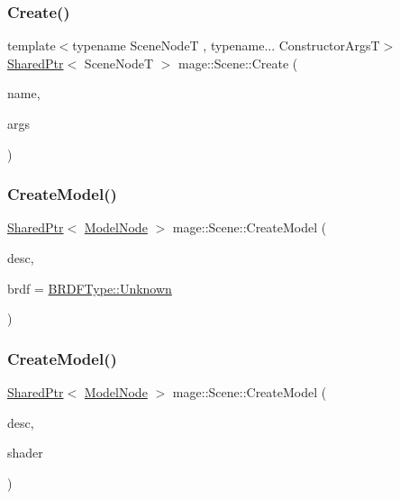 \subsubsection{\texorpdfstring{Create()}{Create()}}
{\footnotesize\ttfamily template$<$typename Scene\+NodeT , typename... Constructor\+ArgsT$>$ \\
\hyperlink{namespacemage_a1e01ae66713838a7a67d30e44c67703e}{Shared\+Ptr}$<$ Scene\+NodeT $>$ mage\+::\+Scene\+::\+Create (\begin{DoxyParamCaption}\item[{const string \&}]{name,  }\item[{Constructor\+ArgsT \&\&...}]{args }\end{DoxyParamCaption})}

\hypertarget{classmage_1_1_scene_a7eba7406c98dab775b09b9e5f466578f}{}\label{classmage_1_1_scene_a7eba7406c98dab775b09b9e5f466578f} 
\subsubsection{\texorpdfstring{Create\+Model()}{CreateModel()}\hspace{0.1cm}{\footnotesize\ttfamily [1/2]}}
{\footnotesize\ttfamily \hyperlink{namespacemage_a1e01ae66713838a7a67d30e44c67703e}{Shared\+Ptr}$<$ \hyperlink{classmage_1_1_model_node}{Model\+Node} $>$ mage\+::\+Scene\+::\+Create\+Model (\begin{DoxyParamCaption}\item[{const \hyperlink{classmage_1_1_model_descriptor}{Model\+Descriptor} \&}]{desc,  }\item[{\hyperlink{namespacemage_ae7a7a03a7b34d7e2689689bb8295cd38}{B\+R\+D\+F\+Type}}]{brdf = {\ttfamily \hyperlink{namespacemage_ae7a7a03a7b34d7e2689689bb8295cd38a88183b946cc5f0e8c96b2e66e1c74a7e}{B\+R\+D\+F\+Type\+::\+Unknown}} }\end{DoxyParamCaption})}

\hypertarget{classmage_1_1_scene_acec24d6be33387814c6022de7ce9de0e}{}\label{classmage_1_1_scene_acec24d6be33387814c6022de7ce9de0e} 
\subsubsection{\texorpdfstring{Create\+Model()}{CreateModel()}\hspace{0.1cm}{\footnotesize\ttfamily [2/2]}}
{\footnotesize\ttfamily \hyperlink{namespacemage_a1e01ae66713838a7a67d30e44c67703e}{Shared\+Ptr}$<$ \hyperlink{classmage_1_1_model_node}{Model\+Node} $>$ mage\+::\+Scene\+::\+Create\+Model (\begin{DoxyParamCaption}\item[{const \hyperlink{classmage_1_1_model_descriptor}{Model\+Descriptor} \&}]{desc,  }\item[{const \hyperlink{structmage_1_1_combined_shader}{Combined\+Shader} \&}]{shader }\end{DoxyParamCaption})}

